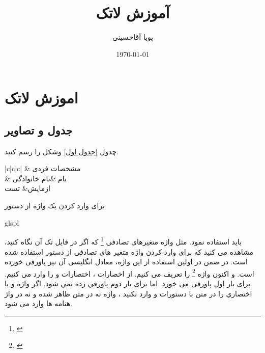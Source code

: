 \documentclass{book}
\title{آموزش لاتک}
\author{پویا آقاحسینی}
\date{\today}
\begin{document}
	\maketitle
	\tableofcontents
	\listoffigures
	\listoftables
	\chapter{اموزش لاتک}\label{ch1}
	\section{جدول و تصاویر}
	چدول 
	\ref{جدول اول}
	وشکل   را رسم کنید.
	\begin{table}[h!]
		\caption{جدول آزمایشی}
		\label{جدول اول}
		\begin{center}
			\begin{tabular}{|c|c|c|}
				\hline
				&
				{مشخصات فردی}
				\\ 
				&  نام
				&نام خانوادگی
				\\
				\hline
				{ازمایش}&
				تست
				\\ 
				\hline
			\end{tabular}
		\end{center}
	\end{table}
برای وارد کردن يک واژه از دستور
	\begin{latin}
		glspl
		\end{latin}
	بايد استفاده نمود. مثل واژه متغيرهای تصادفی
	 \footnote{\label{f1}}
	  که اگر در فايل تک آن نگاه کنید، مشاهده می کنید که برای وارد کردن واژه متغیر های تصادفی از دستور 
	  استفاده شده است. در ضمن در اولين استفاده از اين واژه، معادل انگليسی آن نيز پاورقی خورده است. و اکنون واژه
	   	 \footnote{\label{f2}}
	    را تعريف می کنيم.
	    از اخصارات ، اختصارات 
	    و
	    را وارد می کنيم. برای بار اول پاورقی می خورد. اما برای
	    بار دوم پاورقي زده نمي شود. اگر واژه و يا اختصاري را در متن با دستورات
	    و
	    وارد نکنید ، واژه نه
	    در متن ظاهر شده و نه در واژ هنامه ها وارد می شود.
\end{document}
